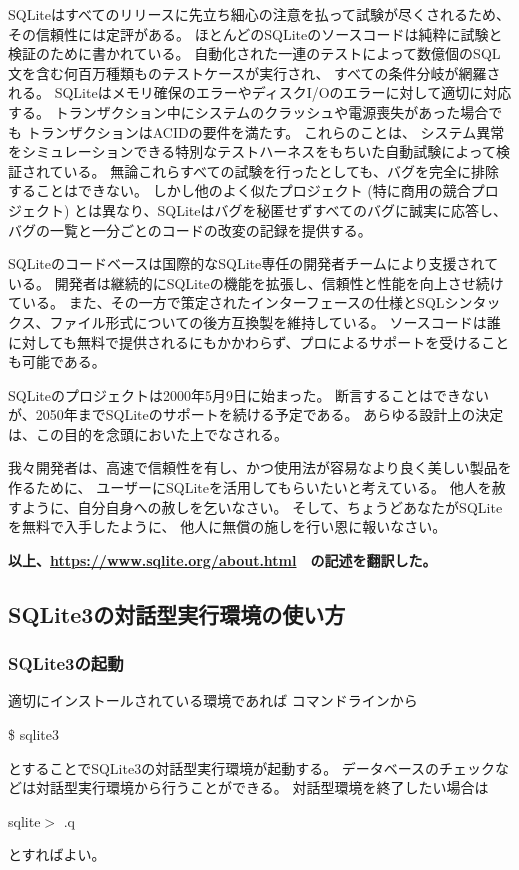 \documentclass [11pt,a4paper,dvipdfmx] {jarticle}
\begin{document}
SQLiteはすべてのリリースに先立ち細心の注意を払って試験が尽くされるため、
その信頼性には定評がある。
ほとんどのSQLiteのソースコードは純粋に試験と検証のために書かれている。
自動化された一連のテストによって数億個のSQL文を含む何百万種類ものテストケースが実行され、
すべての条件分岐が網羅される。
SQLiteはメモリ確保のエラーやディスクI/Oのエラーに対して適切に対応する。
トランザクション中にシステムのクラッシュや電源喪失があった場合でも
トランザクションはACIDの要件を満たす。
これらのことは、
システム異常をシミュレーションできる特別なテストハーネスをもちいた自動試験によって検証されている。
無論これらすべての試験を行ったとしても、バグを完全に排除することはできない。
しかし他のよく似たプロジェクト (特に商用の競合プロジェクト) とは異なり、SQLiteはバグを秘匿せずすべてのバグに誠実に応答し、
バグの一覧と一分ごとのコードの改変の記録を提供する。

SQLiteのコードベースは国際的なSQLite専任の開発者チームにより支援されている。
開発者は継続的にSQLiteの機能を拡張し、信頼性と性能を向上させ続けている。
また、その一方で策定されたインターフェースの仕様とSQLシンタックス、ファイル形式についての後方互換製を維持している。
ソースコードは誰に対しても無料で提供されるにもかかわらず、プロによるサポートを受けることも可能である。

SQLiteのプロジェクトは2000年5月9日に始まった。
断言することはできないが、2050年までSQLiteのサポートを続ける予定である。
あらゆる設計上の決定は、この目的を念頭においた上でなされる。

我々開発者は、高速で信頼性を有し、かつ使用法が容易なより良く美しい製品を作るために、
ユーザーにSQLiteを活用してもらいたいと考えている。
他人を赦すように、自分自身への赦しを乞いなさい。
そして、ちょうどあなたがSQLiteを無料で入手したように、
他人に無償の施しを行い恩に報いなさい。

{\bf 
以上、\url{https://www.sqlite.org/about.html}　の記述を翻訳した。
}

\subsection{SQLite3の対話型実行環境の使い方}
\subsubsection{SQLite3の起動}
適切にインストールされている環境であれば
コマンドラインから
\begin{screen}[4]
    \$ sqlite3
\end{screen}
とすることでSQLite3の対話型実行環境が起動する。
データベースのチェックなどは対話型実行環境から行うことができる。
対話型環境を終了したい場合は
\begin{screen}[4]
    sqlite$>$ .q
\end{screen}
とすればよい。
\end{document}
